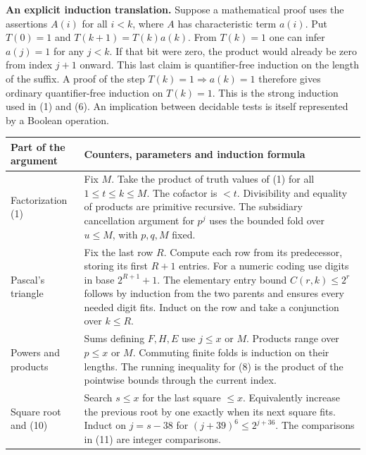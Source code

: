 \documentclass[12pt,letterpaper]{article}
\newcommand{\lead}[1]{\textsf{\bfseries\color{ink}#1}\enspace}
\begin{document}
\lead{An explicit induction translation.} Suppose a mathematical proof uses the assertions \(A(i)\) for all \(i<k\), where \(A\) has characteristic term \(a(i)\). Put \(T(0)=1\) and \(T(k+1)=T(k)a(k)\). From \(T(k)=1\) one can infer \(a(j)=1\) for any \(j<k\). If that bit were zero, the product would already be zero from index \(j+1\) onward. This last claim is quantifier-free induction on the length of the suffix. A proof of the step \(T(k)=1\Rightarrow a(k)=1\) therefore gives ordinary quantifier-free induction on \(T(k)=1\). This is the strong induction used in (1) and (6). An implication between decidable tests is itself represented by a Boolean operation.

\begin{tabularx}{\linewidth}{@{}p{.245\linewidth} X@{}}
\toprule
\textsf{Part of the argument} & \textsf{Counters, parameters and induction formula}\\ \midrule
Factorization (1) & Fix \(M\). Take the product of truth values of (1) for all \(1\le t\le k\le M\). The cofactor is \(<t\). Divisibility and equality of products are primitive recursive. The subsidiary cancellation argument for \(p^j\) uses the bounded fold over \(u\le M\), with \(p,q,M\) fixed.\\[2pt]
Pascal's triangle & Fix the last row \(R\). Compute each row from its predecessor, storing its first \(R+1\) entries. For a numeric coding use digits in base \(2^{R+1}+1\). The elementary entry bound \(C(r,k)\le2^r\) follows by induction from the two parents and ensures every needed digit fits. Induct on the row and take a conjunction over \(k\le R\).\\[2pt]
Powers and products & Sums defining \(F,H,E\) use \(j\le x\) or \(M\). Products range over \(p\le x\) or \(M\). Commuting finite folds is induction on their lengths. The running inequality for (8) is the product of the pointwise bounds through the current index.\\[2pt]
Square root and (10) & Search \(s\le x\) for the last square \(\le x\). Equivalently increase the previous root by one exactly when its next square fits. Induct on \(j=s-38\) for \((j+39)^6\le2^{j+36}\). The comparisons in (11) are integer comparisons.\\
\bottomrule
\end{tabularx}
\end{document}
